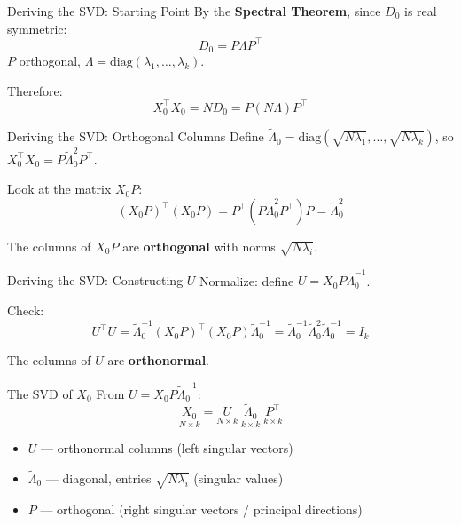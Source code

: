 \documentclass{beamer}
\begin{document}
\begin{frame}{Deriving the SVD: Starting Point}
By the \textbf{Spectral Theorem}, since $D_0$ is real symmetric:
\[
  D_0 = P\Lambda P^\intercal
\]
$P$ orthogonal, $\Lambda = \mathrm{diag}(\lambda_1,\ldots,\lambda_k)$.

\bigskip
Therefore:
\[
  X_0^\intercal X_0 = N D_0 = P(N\Lambda)P^\intercal
\]
\end{frame}

\begin{frame}{Deriving the SVD: Orthogonal Columns}
Define $\tilde{\Lambda}_0 = \mathrm{diag}(\sqrt{N\lambda_1},\ldots,\sqrt{N\lambda_k})$, so $X_0^\intercal X_0 = P\tilde{\Lambda}_0^2 P^\intercal$.

\bigskip
Look at the matrix $X_0 P$:
\[
  (X_0 P)^\intercal (X_0 P) = P^\intercal(P\tilde{\Lambda}_0^2 P^\intercal)P = \tilde{\Lambda}_0^2
\]

\bigskip
The columns of $X_0 P$ are \textbf{orthogonal} with norms $\sqrt{N\lambda_i}$.
\end{frame}

\begin{frame}{Deriving the SVD: Constructing $U$}
Normalize: define $U = X_0 P \tilde{\Lambda}_0^{-1}$.

\bigskip
Check:
\[
  U^\intercal U = \tilde{\Lambda}_0^{-1}(X_0 P)^\intercal(X_0 P)\tilde{\Lambda}_0^{-1}
              = \tilde{\Lambda}_0^{-1}\tilde{\Lambda}_0^2\tilde{\Lambda}_0^{-1} = I_k
\]

\bigskip
The columns of $U$ are \textbf{orthonormal}.
\end{frame}

\begin{frame}{The SVD of $X_0$}
From $U = X_0 P\tilde{\Lambda}_0^{-1}$:
\[
  \underset{N\times k}{X_0} = \underset{N\times k}{U}\;\underset{k\times k}{\tilde{\Lambda}_0}\;\underset{k\times k}{P^\intercal}
\]

\bigskip
\begin{itemize}
  \item $U$ \quad — orthonormal columns (left singular vectors)
  \item $\tilde{\Lambda}_0$ — diagonal, entries $\sqrt{N\lambda_i}$ (singular values)
  \item $P$ \quad — orthogonal (right singular vectors / principal directions)
\end{itemize}
\end{frame}
\end{document}
